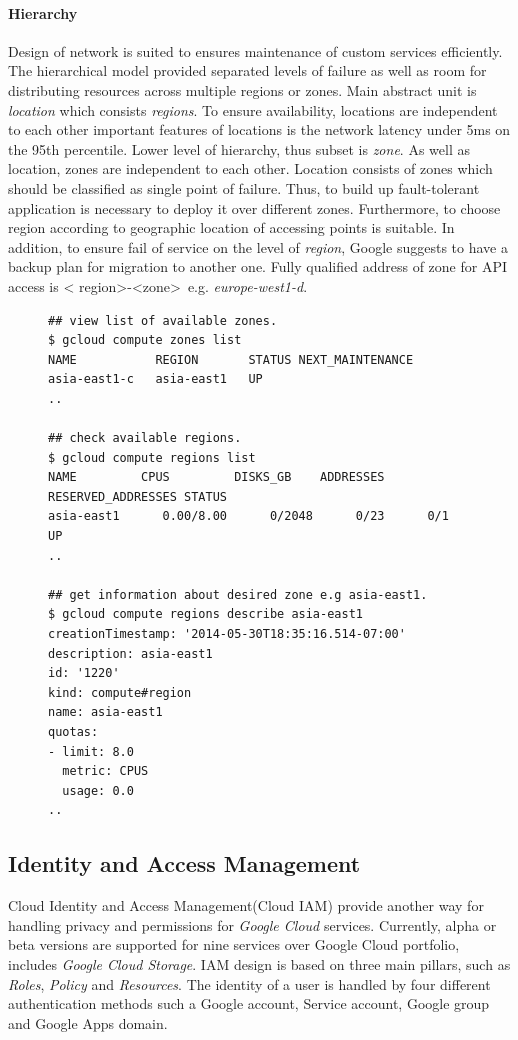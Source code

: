 \documentclass[a4paper,12pt,oneside]{report}
\begin{document}
\paragraph*{Hierarchy}
Design of network is suited to ensures maintenance  of custom services efficiently. The hierarchical model provided separated
 levels of failure as well as room for distributing resources across multiple regions or zones. Main abstract unit is \textit{location} 
 which consists \textit{regions}. To ensure availability, locations are independent to each other important features of locations is the 
 network latency under 5ms on the 95th percentile. Lower level of hierarchy, thus subset is \textit{zone}. As well as location, 
 zones are independent to each other. Location consists of zones which should be classified as single point of failure. Thus, 
 to build up fault-tolerant application is necessary to deploy it over different zones. Furthermore, to choose region according 
 to geographic location of accessing points is suitable. In addition, to ensure fail of service on the level of \textit{region}, 
 Google suggests to have a backup plan for migration to another one. Fully qualified address of zone   for API access is \textless 
 region\textgreater-\textless zone\textgreater \ e.g. \textit{europe-west1-d}. 

\begin{figure}[!htbp]
\lstset{extendedchars=false,escapeinside=''}
\begin{lstlisting}[style=mybash]
## view list of available zones.
$ gcloud compute zones list
NAME           REGION       STATUS NEXT_MAINTENANCE 
asia-east1-c   asia-east1   UP
..

## check available regions.
$ gcloud compute regions list
NAME         CPUS         DISKS_GB    ADDRESSES RESERVED_ADDRESSES STATUS 
asia-east1      0.00/8.00      0/2048      0/23      0/1           UP
..

## get information about desired zone e.g asia-east1.
$ gcloud compute regions describe asia-east1
creationTimestamp: '2014-05-30T18:35:16.514-07:00'
description: asia-east1
id: '1220'
kind: compute#region
name: asia-east1
quotas:
- limit: 8.0
  metric: CPUS
  usage: 0.0
..
\end{lstlisting} \end{figure}
        



\subsection{Identity and Access Management}
Cloud Identity and Access Management(Cloud IAM) provide another way for handling privacy 
and permissions for \textit{Google Cloud} services. Currently, alpha  or beta versions are 
supported for nine services over Google Cloud portfolio, 
includes \textit{Google Cloud Storage}. IAM design is based on three main pillars, 
such as \textit{Roles}, \textit{Policy} and \textit{Resources}. The 
identity of a user is handled by four different authentication methods such a Google 
account, Service account, Google group and Google Apps domain.
\end{document}
